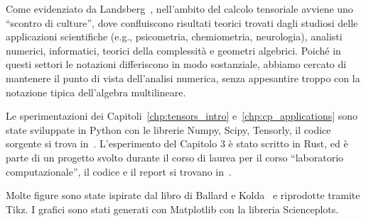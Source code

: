 Come evidenziato da Landsberg~\cite[\S 0.3]{landsberg2011tensors}, nell'ambito del calcolo tensoriale avviene uno ``scontro di
culture'', dove confluiscono risultati teorici trovati dagli studiosi delle applicazioni scientifiche
(e.g., psicometria, chemiometria, neurologia), analisti numerici, informatici, teorici della complessità e
geometri algebrici. Poiché in questi settori le notazioni differiscono in modo sostanziale, abbiamo cercato
di mantenere il punto di vista dell'analisi numerica, senza appesantire troppo con la notazione tipica dell'algebra multilineare.

Le sperimentazioni dei Capitoli~\ref{chp:tensors_intro} e~\ref{chp:cp_applications} sono state sviluppate in
Python con le librerie Numpy, Scipy, Tensorly, il codice sorgente si trova in~\cite{defending1_experiments_2026}. L'esperimento del
Capitolo 3 è stato scritto in Rust, ed è parte di un progetto svolto durante il corso di laurea per
il corso ``laboratorio computazionale'', il codice e il report si trovano in~\cite{defending1_fastmatmul_2026}.

Molte figure sono state ispirate dal libro di Ballard e Kolda~\cite{BK25} e riprodotte tramite Tikz.
I grafici sono stati generati con Matplotlib con la libreria Scienceplots.
